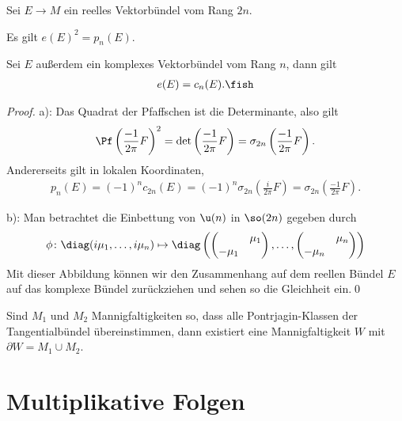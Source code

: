 \documentclass[%
	paper=a5,%
	fleqn,%
	DIV=18,%
	BCOR=0mm,
	fontsize=11pt,
	titlepage=false,%
	bibliography=totoc,
	DIV=18,%
	twoside=true,
	pdftitle=Riemannsche Geometrie,
	pdfauthor=Uwe Semmelmann,
	numbers=noendperiod]%
	{scrbook}
\begin{document}
\begin{lem}
Sei $E\to M$ ein reelles Vektorbündel vom Rang $2n$.
\begin{propenum}
\item Es gilt $e(E)^2 = p_{n}(E)$.
\item Sei $E$ außerdem ein komplexes Vektorbündel vom Rang $n$, dann gilt
\begin{align*}
e(E) = c_{n}(E).\fish
\end{align*}
\end{propenum}
\end{lem}
\begin{proof}
a): Das Quadrat der Pfaffschen ist die Determinante, also gilt
\begin{align*}
\Pf\left(\frac{-1}{2\pi}F\right)^2 = 
\det\left(\frac{-1}{2\pi}F\right) = \sigma_{2n}\left(\frac{-1}{2\pi}F\right).
\end{align*}
Andererseits gilt in lokalen Koordinaten,
\begin{align*}
p_{n}(E) = (-1)^n c_{2n}(E) = 
(-1)^n \sigma_{2n}\left( \frac{i}{2\pi}F\right)
= \sigma_{2n}\left( \frac{-1}{2\pi}F\right).
\end{align*}

b): Man betrachtet die Einbettung von $\u(n)$ in $\so(2n)$ gegeben durch
\begin{align*}
\phi\colon \diag(i\mu_{1},\ldots,i\mu_{n}) \mapsto
\diag
\left(
\begin{pmatrix}
& \mu_{1}\\
-\mu_{1}
\end{pmatrix},
\ldots,
\begin{pmatrix}
& \mu_{n}\\
-\mu_{n}
\end{pmatrix}
\right)
\end{align*}
Mit dieser Abbildung können wir den Zusammenhang auf dem reellen Bündel $E$ auf das komplexe Bündel zurückziehen und sehen so die Gleichheit ein.\qed
\end{proof}

\begin{rem}
Sind $M_{1}$ und $M_{2}$ Mannigfaltigkeiten so, dass alle Pontrjagin-Klassen der Tangentialbündel übereinstimmen, dann existiert eine Mannigfaltigkeit $W$ mit $\partial W = M_{1}\cup M_{2}$.\map
\end{rem}

\section{Multiplikative Folgen}
\end{document}
